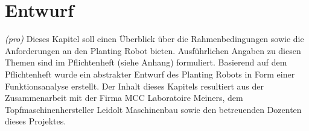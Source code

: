 \newpage
\section{Entwurf}
\textit{(pro)} Dieses Kapitel soll einen Überblick über die Rahmenbedingungen sowie die Anforderungen an den Planting Robot bieten. Ausführlichen Angaben zu diesen Themen sind im Pflichtenheft (siehe Anhang) formuliert. Basierend auf dem Pflichtenheft wurde ein abstrakter Entwurf des Planting Robots in Form einer Funktionsanalyse erstellt. Der Inhalt dieses Kapitels resultiert aus der Zusammenarbeit mit der Firma MCC Laboratoire Meiners, dem Topfmaschinenhersteller Leidolt Maschinenbau sowie den betreuenden Dozenten dieses Projektes.

